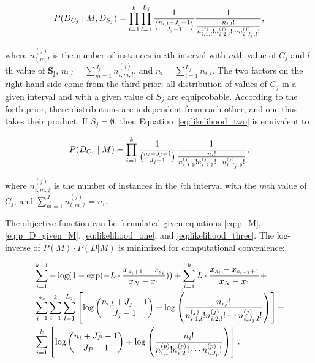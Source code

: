 \begin{equation}
\label{eq:likelihood_two}
P(D_{C_j}  \mid M, D_{S_j}) =
\prod_{i=1}^{k} \prod_{l=1}^{L_j} {{1}\over{{n_{i,l} + J_j - 1}\choose{J_j-1}}}
{{1}\over{ {{n_{i,l}}!}\over{ {n^{(j)}_{i,1,l} !} {n^{(j)}_{i,2,l} !} \cdots {n^{(j)}_{i,J_j,l} !}}  }}\text{,}
\end{equation}

\noindent
where $n^{(j)}_{i,m,l}$ is the number of instances in $i$th interval with $m$th value of $C_j$ and $l$th value of $\boldsymbol{S_j}$, $n_{i,l} = \sum_{m=1}^{J_j} n^{(j)}_{i,m,l}$, and $n_i = \sum_{l=1}^{L_j} n_{i,l}$.
The two factors on the right hand side come from the third prior: all distribution of values of $C_j$ in a given interval and with a given value of $S_j$ are equiprobable. According to the forth prior, these distributions are independent from each other, and one thus takes their product. If $S_j = \emptyset$, then Equation~\ref{eq:likelihood_two} is equivalent to

\begin{equation}
\label{eq:likelihood_three}
P(D_{C_j}  \mid M) =
\prod_{i=1}^{k}  {{1}\over{{n_{i} + J_j - 1}\choose{J_j-1}}}
{{1}\over{ {{n_{i}}!}\over{ {n^{(j)}_{i,1,\emptyset} !} {n^{(j)}_{i,2,\emptyset} !} \cdots {n^{(j)}_{i,J_j,\emptyset} !}}  }}\text{,}
\end{equation}

\noindent
where $n^{(j)}_{i,m,\emptyset}$ is the number of instances in the $i$th interval with the $m$th value of $C_j$, and $\sum_{m=1}^{J_j} n^{(j)}_{i,m,\emptyset} = n_i$.

The objective function can be formulated given equations \ref{eq:p_M}, \ref{eq:p_D_given_M}, \ref{eq:likelihood_one}, and \ref{eq:likelihood_three}.
The log-inverse of $P(M) \cdot P(D|M)$ is minimized for computational convenience:

\begin{equation}
\label{eq:opt_prob}
\begin{aligned}
& \sum_{i=1}^{k-1} - \log(1 - {\exp(- L \cdot {{x_{s_i+1} - x_{s_i}}\over{x_N - x_1}})}) +  \sum_{i=1}^{k} L \cdot {{x_{s_{i}} - x_{s_{i-1} + 1}}\over{x_N - x_1}} +\\
&  \sum_{j=1}^{n_c} \sum_{i=1}^{k}  \sum_{l=1}^{L_j} \left[  \log{{n_{i,l} + J_j - 1}\choose{J_j-1}} + \log \left( { {{n_{i,l}}!}\over{ {n^{(j)}_{i,1,l} !} {n^{(j)}_{i,2,l} !} \cdots {n^{(j)}_{i,J_j,l} !}} } \right) \right] + \\
& \sum_{i=1}^k \left[  \log {{n_{i} + J_P - 1}\choose{J_P-1}} + \log \left( { {{n_i}!}\over{ {n^{(p)}_{i,1} !} {n^{(p)}_{i,2} !} \cdots {n^{(p)}_{i,J_p} !}} } \right) \right]\text{.}
\end{aligned}
\end{equation}

